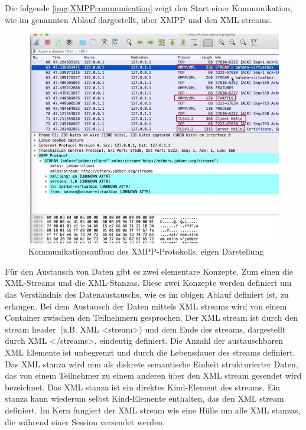 \documentclass[a4paper,titlepage,halfparskip,12pt]{scrreprt}
\begin{document}
\begin{onehalfspacing}
\pagebreak

Die folgende \autoref{img:XMPPcommunication} zeigt den Start einer Kommunikation, wie im genannten Ablauf dargestellt, über \ac{XMPP} und den \ac{XML}-streams.

\begin{figure}[h]
	\centering
	\includegraphics[width=\textwidth]{images/XML_Wireshark}
	\caption{Kommunikationsaufbau des \ac{XMPP}-Protokolls, eigen Darstellung} %
	\label{img:XMPPcommunication}
\end{figure} 

Für den Austausch von Daten gibt es zwei elementare Konzepte. Zum einen die \ac{XML}-Streams und die \ac{XML}-Stanzas. Diese zwei Konzepte werden definiert um das Verständnis des Datenaustauschs, wie es im obigen Ablauf definiert ist, zu erlangen. Bei dem Austausch der Daten mittels \ac{XML} streams wird von einem Container zwischen den Teilnehmern gesprochen. Der \ac{XML} stream ist durch den \glqq stream header\grqq\ (z.B. \ac{XML} <stream>) und dem Ende des streams, dargestellt durch \ac{XML} </streams>, eindeutig definiert. Die Anzahl der austauschbaren \ac{XML} Elemente ist unbegrenzt und durch die Lebensdauer des streams definiert. Das \ac{XML} stanza wird nun als diskrete semantische Einheit strukturierter Daten, das von einem Teilnehmer zu einem anderen über den \ac{XML} stream gesendet wird bezeichnet. Das \ac{XML} stanza ist ein direktes Kind-Element des streams. Ein stanza kann wiederum selbst Kind-Elemente enthalten, das den \ac{XML} stream definiert. Im Kern fungiert der \ac{XML} stream wie eine Hülle um alle \ac{XML} stanzas, die während einer Session versendet werden.


\end{onehalfspacing}
\end{document}
